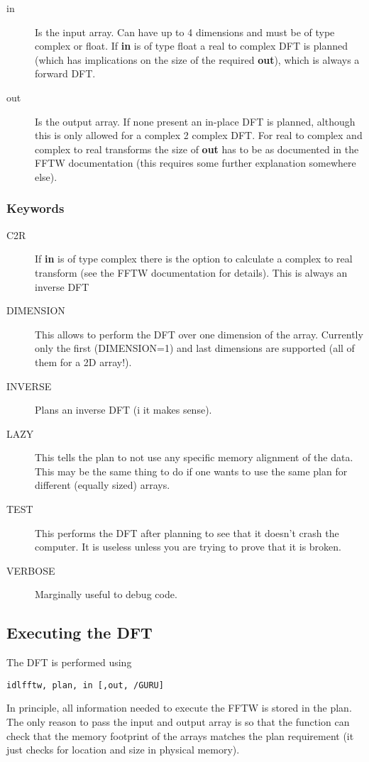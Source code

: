 \documentclass[a4paper,11pt]{article}
\begin{document}
\begin{description}
\item[in] Is the input array. Can have up to 4 dimensions and must be of type complex or float. If \textbf{in} is of type float a real to complex DFT is planned (which has implications on the size of the required \textbf{out}), which is always a forward DFT.
\item[out] Is the output array. If none present an in-place DFT is planned, although this is only allowed for a complex 2 complex DFT. For real to complex and complex to real transforms the size of \textbf{out} has to be as documented in the FFTW documentation (this requires some further explanation somewhere else).
\end{description}

\subsubsection*{Keywords}

\begin{description}
\item[C2R] If \textbf{in} is of type complex there is the option to calculate a complex to real transform (see the FFTW documentation for details). This is always an inverse DFT
\item[DIMENSION] This allows to perform the DFT over one dimension of the array. Currently only the first (DIMENSION=1) and last dimensions are supported (all of them for a 2D array!).
\item[INVERSE] Plans an inverse DFT (i it makes sense).
\item[LAZY] This tells the plan to not use any specific memory alignment of the data. This may be the same thing to do if one wants to use the same plan for different (equally sized) arrays.
\item[TEST] This performs the DFT after planning to see that it doesn't crash the computer. It is useless unless you are trying to prove that it is broken.
\item[VERBOSE] Marginally useful to debug code.
\end{description}


\subsection{Executing the DFT}

The DFT is performed using
\begin{verbatim}
idlfftw, plan, in [,out, /GURU]
\end{verbatim}
In principle, all information needed to execute the FFTW is stored in the plan. The only reason to pass the input and output array is so that the function can check that the memory footprint of the arrays matches the plan requirement (it just checks for location and size in physical memory).
\end{document}
